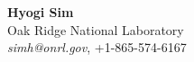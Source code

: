 \documentclass[letterpaper,11pt]{article}
\begin{document}
 


{\textbf{\Large Hyogi Sim}}\\
{
{Oak Ridge National Laboratory}\\
{\emph{simh@onrl.gov}, +1-865-574-6167}
}


 

 





% 
%
 
\end{document}
